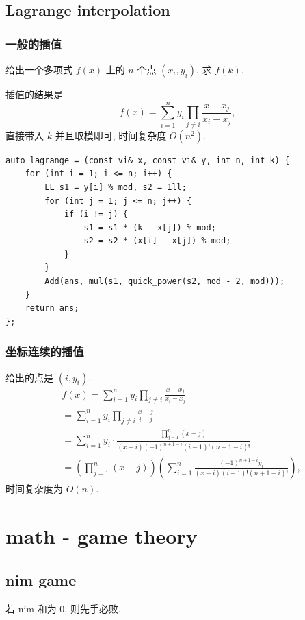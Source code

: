 \documentclass[UTF8, a4paper, titlepage, twoside]{ctexart}
\begin{document}
\subsection*{ Lagrange interpolation }

\subsubsection*{ 一般的插值 }

给出一个多项式 \(f(x)\) 上的 \(n\) 个点 \((x_i, y_i)\), 求 \(f(k)\).

插值的结果是
\[
f(x) = \sum_{i=1}^{n} y_i \prod_{j \neq i} \frac{x - x_j}{x_i - x_j},
\]
直接带入 \(k\) 并且取模即可, 时间复杂度 $O(n^2)$.

\begin{lstlisting}[style=cpp]
auto lagrange = (const vi& x, const vi& y, int n, int k) {
    for (int i = 1; i <= n; i++) {
        LL s1 = y[i] % mod, s2 = 1ll;
        for (int j = 1; j <= n; j++) {
            if (i != j) {
                s1 = s1 * (k - x[j]) % mod;
                s2 = s2 * (x[i] - x[j]) % mod;
            }
        }
        Add(ans, mul(s1, quick_power(s2, mod - 2, mod)));
    }
    return ans;
};
\end{lstlisting}

\subsubsection*{ 坐标连续的插值 }

给出的点是 $(i, y_i)$.
\[
\begin{aligned}
& f(x) = \sum_{i=1}^{n} y_i \prod_{j \neq i} \frac{x - x_j}{x_i - x_j} \\
& = \sum_{i=1}^{n} y_i \prod_{j \neq i} \frac{x - j}{i - j} \\
& = \sum_{i=1}^{n} y_i \cdot \frac{\prod\limits_{j=1}^n (x - j)}{(x - i) (-1)^{n+1-i}(i-1)!(n+1-i)!} \\
& = \left( \prod_{j=1}^n (x - j) \right) \left(\sum_{i=1}^n \frac{(-1)^{n+1-i}y_i}{(x-i)(i-1)!(n+1-i)!}\right),
\end{aligned}
\]
时间复杂度为 \(O(n)\).

\newpage
\section{ math - game theory }
\subsection{ nim game }
若 nim 和为 0, 则先手必败.
\end{document}
